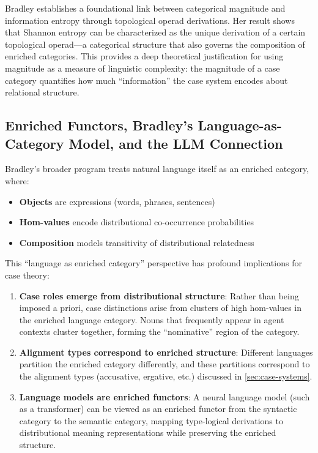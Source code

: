 \documentclass[
]{article}
\providecommand{\tightlist}{%
  \setlength{\itemsep}{0pt}\setlength{\parskip}{0pt}}
\numberwithin{equation}{section}
\begin{document}
Bradley \citeyearpar{bradley2020entropy} establishes a foundational link
between categorical magnitude and information entropy through
topological operad derivations. Her result shows that Shannon entropy
can be characterized as the unique derivation of a certain topological
operad---a categorical structure that also governs the composition of
enriched categories. This provides a deep theoretical justification for
using magnitude as a measure of linguistic complexity: the magnitude of
a case category quantifies how much ``information'' the case system
encodes about relational structure.

\subsection{Enriched Functors, Bradley's Language-as-Category Model, and
the LLM
Connection}\label{enriched-functors-bradleys-language-as-category-model-and-the-llm-connection}

Bradley's
\citetext{\citeyear{bradley2024ipam}; \citeyear{bradley2025tea}} broader
program treats natural language itself as an enriched category, where:

\begin{itemize}
\tightlist
\item
  \textbf{Objects} are expressions (words, phrases, sentences)
\item
  \textbf{Hom-values} encode distributional co-occurrence probabilities
\item
  \textbf{Composition} models transitivity of distributional relatedness
\end{itemize}

This ``language as enriched category'' perspective has profound
implications for case theory:

\begin{enumerate}
\def\labelenumi{\arabic{enumi}.}
\item
  \textbf{Case roles emerge from distributional structure}: Rather than
  being imposed a priori, case distinctions arise from clusters of high
  hom-values in the enriched language category. Nouns that frequently
  appear in agent contexts cluster together, forming the ``nominative''
  region of the category.
\item
  \textbf{Alignment types correspond to enriched structure}: Different
  languages partition the enriched category differently, and these
  partitions correspond to the alignment types (accusative, ergative,
  etc.) discussed in \autoref{sec:case-systems}.
\item
  \textbf{Language models are enriched functors}: A neural language
  model (such as a transformer) can be viewed as an enriched functor
  from the syntactic category to the semantic category, mapping
  type-logical derivations to distributional meaning representations
  while preserving the enriched structure.
\end{enumerate}
\end{document}
